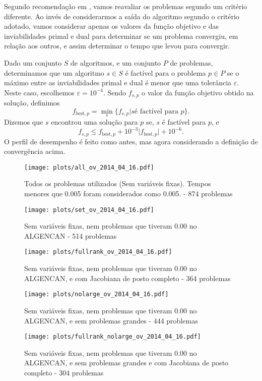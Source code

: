 \documentclass{article}
\begin{document}
Segundo recomendação em \cite{bib:compare-optimal-values}, vamos reavaliar os
problemas segundo um critério diferente.
Ao invés de considerarmos a saída do algoritmo segundo o critério adotado, vamos
considerar apenas os valores da função objetivo e das inviabilidades primal e
dual para determinar se um problema convergiu, em relação aos outros, e assim
determinar o tempo que levou para convergir.

Dado um conjunto $S$ de algoritmos, e um conjunto $P$ de problemas, determinamos
que um algoritmo $s \in S$ é factível para o problema $p \in P$ se o máximo
entre as inviabilidades primal e dual é menor que uma tolerância $\varepsilon$.
Neste caso, escolhemos $\varepsilon = 10^{-4}$.
Sendo $f_{s,p}$ o valor da função objetivo obtido na solução, definimos
\newcommand{\fbest}{f_{\mbox{best},p}}
$$ \fbest = \min_s\{f_{s,p} | s \mbox{é factível para } p\}. $$
Dizemos que $s$ encontrou uma solução para $p$ se, $s$ é factível para $p$, e
$$ f_{s,p} \leq \fbest + 10^{-3}\vert \fbest \vert + 10^{-6}. $$
O perfil de desempenho é feito como antes, mas agora considerando a definição de
convergência acima.

\begin{figure}[H]
  \centering
  \texttt{[image: plots/all\_ov\_2014\_04\_16.pdf]}
  \caption{Todos os problemas utilizados (Sem variáveis fixas). Tempos menores
    que 0.005 foram considerados como 0.005. - 874 problemas}
\end{figure}
\begin{figure}[H]
  \centering
  \texttt{[image: plots/set\_ov\_2014\_04\_16.pdf]}
  \caption{Sem variáveis fixas, nem problemas
    que tiveram 0.00 no ALGENCAN - 514 problemas}
\end{figure}
\begin{figure}[H]
  \centering
  \texttt{[image: plots/fullrank\_ov\_2014\_04\_16.pdf]}
  \caption{Sem variáveis fixas, nem problemas
    que tiveram 0.00 no ALGENCAN, e com Jacobiana de posto completo - 364
    problemas}
\end{figure}
\begin{figure}[H]
  \centering
  \texttt{[image: plots/nolarge\_ov\_2014\_04\_16.pdf]}
  \caption{Sem variáveis fixas, nem problemas
    que tiveram 0.00 no ALGENCAN, e sem problemas grandes - 444 problemas}
\end{figure}
\begin{figure}[H]
  \centering
  \texttt{[image: plots/fullrank\_nolarge\_ov\_2014\_04\_16.pdf]}
  \caption{Sem variáveis fixas, nem problemas
    que tiveram 0.00 no ALGENCAN, e sem problemas grandes e com Jacobiana de
    posto completo - 304 problemas}
\end{figure}



\end{document}
